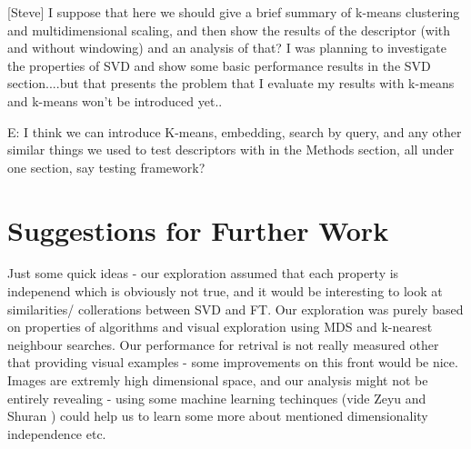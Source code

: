 \documentclass{report}
\begin{document}
[Steve] I suppose that here we should give a brief summary of k-means clustering and multidimensional scaling, and then show the results of the descriptor (with and without windowing) and an analysis of that? I was planning to investigate the properties of SVD and show some basic performance results in the SVD section....but that presents the problem that I evaluate my results with k-means and k-means won't be introduced yet..

E: I think we can introduce K-means, embedding, search by query, and any other similar things we used to test descriptors with in the Methods section, all under one section, say testing framework?


\chapter{Suggestions for Further Work}
Just some quick ideas - our exploration assumed that each property is indepenend which is obviously not true, and it would be interesting to look at similarities/ collerations between SVD and FT. 
Our exploration was purely based on properties of algorithms and visual exploration using MDS and k-nearest neighbour searches. Our performance for retrival is not really measured other that providing visual examples - some improvements on this front would be nice.
Images are extremly high dimensional space, and our analysis might not be entirely revealing - using some machine learning techinques (vide Zeyu and Shuran ) could help us to learn some more about mentioned dimensionality independence etc.
\end{document}
